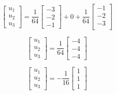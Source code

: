 \documentclass{extarticle}
\begin{document}
    \begin{equation*}
        \begin{bmatrix}
            u_1 \\
            u_2 \\
            u_3
        \end{bmatrix}
        = \frac{1}{64}
        \begin{bmatrix}
            -3 \\
            -2 \\
            -1
        \end{bmatrix}
        + 0 +
        \frac{1}{64}
        \begin{bmatrix}
            -1 \\
            -2 \\
            -3 \\
        \end{bmatrix}
    \end{equation*}

    \begin{equation*}
        \begin{bmatrix}
            u_1 \\
            u_2 \\
            u_3
        \end{bmatrix}
        = \frac{1}{64}
        \begin{bmatrix}
            -4 \\
            -4 \\
            -4
        \end{bmatrix}
    \end{equation*}

    \begin{equation*}
        \begin{bmatrix}
            u_1 \\
            u_2 \\
            u_3
        \end{bmatrix}
        = -\frac{1}{16}
        \begin{bmatrix}
            1 \\
            1 \\
            1
        \end{bmatrix}
    \end{equation*}
\end{document}
